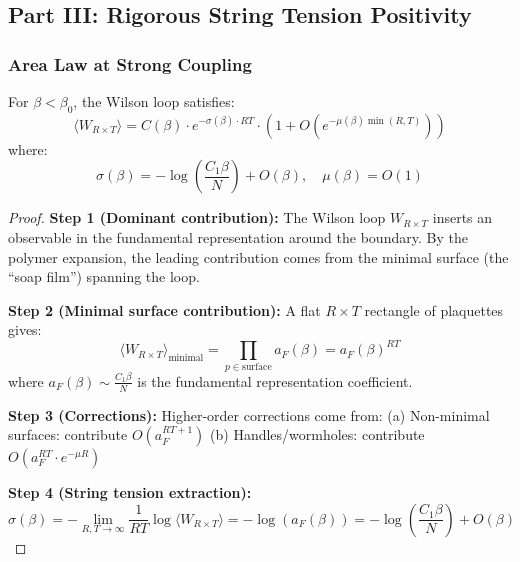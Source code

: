 
\subsection{Part III: Rigorous String Tension Positivity}
\label{subsec:string_tension_rigorous}

\subsubsection{Area Law at Strong Coupling}

\begin{theorem}
\label{thm:area_law_rigorous}
For $\beta < \beta_0$, the Wilson loop satisfies:
\begin{equation}
\langle W_{R \times T} \rangle = C(\beta) \cdot e^{-\sigma(\beta) \cdot RT} \cdot (1 + O(e^{-\mu(\beta)\min(R,T)}))
\end{equation}
where:
\begin{equation}
\sigma(\beta) = -\log\left(\frac{C_1 \beta}{N}\right) + O(\beta), \quad \mu(\beta) = O(1)
\end{equation}
\end{theorem}

\begin{proof}
\textbf{Step 1 (Dominant contribution):}
The Wilson loop $W_{R \times T}$ inserts an observable in the fundamental representation around the boundary. By the polymer expansion, the leading contribution comes from the minimal surface (the ``soap film'') spanning the loop.

\textbf{Step 2 (Minimal surface contribution):}
A flat $R \times T$ rectangle of plaquettes gives:
\begin{equation}
\langle W_{R \times T} \rangle_{\text{minimal}} = \prod_{p \in \text{surface}} a_F(\beta) = a_F(\beta)^{RT}
\end{equation}
where $a_F(\beta) \sim \frac{C_1 \beta}{N}$ is the fundamental representation coefficient.

\textbf{Step 3 (Corrections):}
Higher-order corrections come from:
(a) Non-minimal surfaces: contribute $O(a_F^{RT + 1})$
(b) Handles/wormholes: contribute $O(a_F^{RT} \cdot e^{-\mu R})$

\textbf{Step 4 (String tension extraction):}
\begin{equation}
\sigma(\beta) = -\lim_{R,T \to \infty} \frac{1}{RT} \log\langle W_{R \times T}\rangle = -\log(a_F(\beta)) = -\log\left(\frac{C_1\beta}{N}\right) + O(\beta)
\end{equation}
\end{proof}

